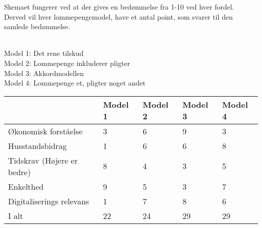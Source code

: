 Skemaet fungerer ved at der gives en bedømmelse fra 1-10 ved hver fordel. Derved vil hver lommepengemodel, have et antal point, som svarer til den samlede bedømmelse.

\\Model 1: Det rene tilskud
\\Model 2: Lommepenge inkluderer pligter
\\Model 3: Akkordmodellen
\\Model 4: Lommepenge et, pligter noget andet

\begin{center}
   \begin{tabular}{| l | l | l | l | l |} 
   \hline
   & Model 1 & Model 2 & Model 3 & Model 4 \\ \hline
   Økonomisk forståelse & 3 & 6 & 9 & 3 \\ \hline
   Husstandsbidrag & 1 & 6 & 6 & 8 \\ \hline
   Tidskrav (Højere er bedre) & 8 & 4 & 3 & 5 \\ \hline
   Enkelthed & 9 & 5 & 3 & 7 \\ \hline
   Digitaliserings relevans & 1 & 7 & 8 & 6 \\ \hline
   I alt & 22 & 24 & 29 & 29 \\ \hline
   \hline
   \end{tabular}
\end{center}
